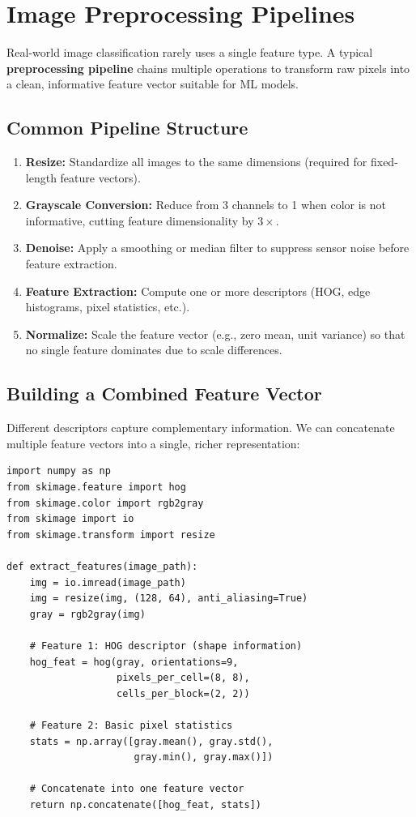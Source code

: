 \section*{Image Preprocessing Pipelines}

Real-world image classification rarely uses a single feature type. A typical \textbf{preprocessing pipeline} chains multiple operations to transform raw pixels into a clean, informative feature vector suitable for ML models.

\subsection*{Common Pipeline Structure}

\begin{enumerate}
    \item \textbf{Resize:} Standardize all images to the same dimensions (required for fixed-length feature vectors).
    \item \textbf{Grayscale Conversion:} Reduce from 3 channels to 1 when color is not informative, cutting feature dimensionality by $3\times$.
    \item \textbf{Denoise:} Apply a smoothing or median filter to suppress sensor noise before feature extraction.
    \item \textbf{Feature Extraction:} Compute one or more descriptors (HOG, edge histograms, pixel statistics, etc.).
    \item \textbf{Normalize:} Scale the feature vector (e.g., zero mean, unit variance) so that no single feature dominates due to scale differences.
\end{enumerate}

\subsection*{Building a Combined Feature Vector}

Different descriptors capture complementary information. We can concatenate multiple feature vectors into a single, richer representation:

\begin{lstlisting}[style=pythonstyle]
import numpy as np
from skimage.feature import hog
from skimage.color import rgb2gray
from skimage import io
from skimage.transform import resize

def extract_features(image_path):
    img = io.imread(image_path)
    img = resize(img, (128, 64), anti_aliasing=True)
    gray = rgb2gray(img)

    # Feature 1: HOG descriptor (shape information)
    hog_feat = hog(gray, orientations=9,
                   pixels_per_cell=(8, 8),
                   cells_per_block=(2, 2))

    # Feature 2: Basic pixel statistics
    stats = np.array([gray.mean(), gray.std(),
                      gray.min(), gray.max()])

    # Concatenate into one feature vector
    return np.concatenate([hog_feat, stats])
\end{lstlisting}

